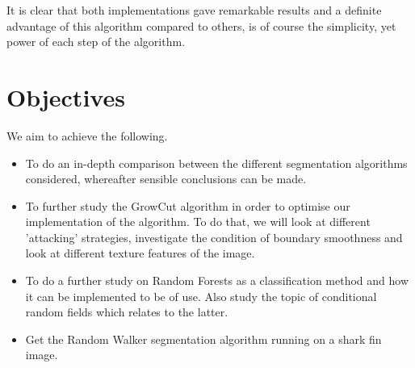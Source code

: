 \documentclass[a4paper,10pt]{article}
\begin{document}
\noindent It is clear that both implementations gave remarkable results and a
definite advantage of this algorithm compared to others, is of course the
simplicity, yet power of each step of the algorithm. 


\section{Objectives}
We aim to achieve the following.
\begin{itemize}
 \item To do an in-depth comparison between the different segmentation
algorithms considered, whereafter sensible conclusions can be made. 
 \item To further study the GrowCut algorithm in order to optimise our
implementation of the algorithm.  To do that, we will look at different
'attacking' strategies, investigate the condition of boundary smoothness and
look at different texture features of the image.
 \item To do a further study on Random Forests as a classification method and
how it can be implemented to be of use.  Also study the topic of conditional
random fields which relates to the latter.
 \item Get the Random Walker segmentation algorithm running on a shark fin
image.
\end{itemize}

\newpage

\end{document}
